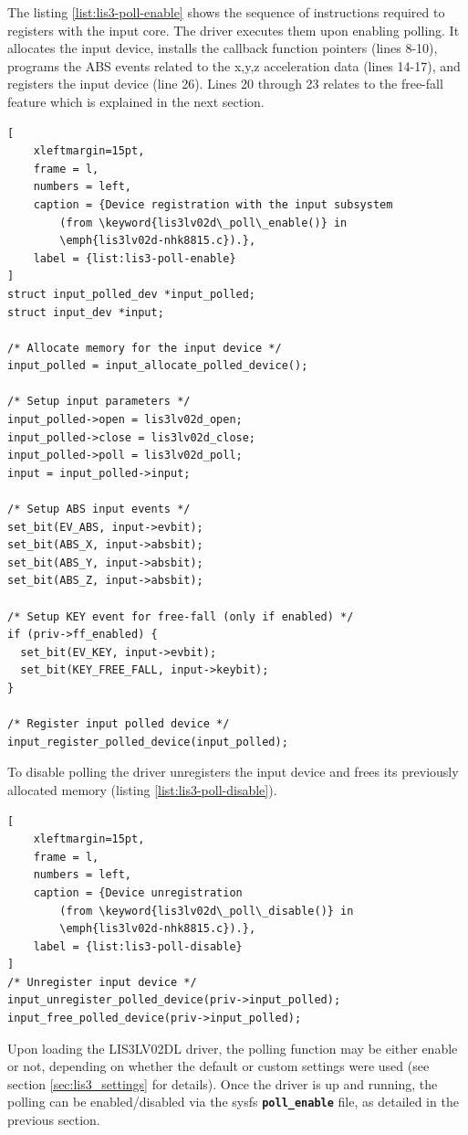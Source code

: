 \documentclass[a4paper,10pt]{article}
\newcommand{\keyword}[1]{\texttt{\textbf{#1}}}
\begin{document}
\begin{multicols}{2}
The listing \ref{list:lis3-poll-enable} shows the sequence of instructions
required to registers with the input core. The driver executes them upon
enabling polling. It allocates the input device, installs the callback
function pointers (lines 8-10), programs the ABS events related to the x,y,z
acceleration data (lines 14-17), and registers the input device (line 26).
Lines 20 through 23 relates to the free-fall feature which is explained in
the next section.

\begin{lstlisting}[
	xleftmargin=15pt,
	frame = l,
	numbers = left,
	caption = {Device registration with the input subsystem
		(from \keyword{lis3lv02d\_poll\_enable()} in
		\emph{lis3lv02d-nhk8815.c}).},
	label = {list:lis3-poll-enable}
]
struct input_polled_dev *input_polled;
struct input_dev *input;

/* Allocate memory for the input device */
input_polled = input_allocate_polled_device();

/* Setup input parameters */
input_polled->open = lis3lv02d_open;
input_polled->close = lis3lv02d_close;
input_polled->poll = lis3lv02d_poll;
input = input_polled->input;

/* Setup ABS input events */
set_bit(EV_ABS, input->evbit);
set_bit(ABS_X, input->absbit);
set_bit(ABS_Y, input->absbit);
set_bit(ABS_Z, input->absbit);

/* Setup KEY event for free-fall (only if enabled) */
if (priv->ff_enabled) {
  set_bit(EV_KEY, input->evbit);
  set_bit(KEY_FREE_FALL, input->keybit);
}

/* Register input polled device */
input_register_polled_device(input_polled);
\end{lstlisting}

To disable polling the driver unregisters the input device and frees its
previously allocated memory (listing \ref{list:lis3-poll-disable}).

\begin{lstlisting}[
	xleftmargin=15pt,
	frame = l,
	numbers = left,
	caption = {Device unregistration
		(from \keyword{lis3lv02d\_poll\_disable()} in 
		\emph{lis3lv02d-nhk8815.c}).},
	label = {list:lis3-poll-disable}
]
/* Unregister input device */
input_unregister_polled_device(priv->input_polled);
input_free_polled_device(priv->input_polled);
\end{lstlisting}

Upon loading the LIS3LV02DL driver, the polling function may be either enable
or not, depending on whether the default or custom settings were used
(see section \ref{sec:lis3_settings} for details).
Once the driver is up and running, the polling can be enabled/disabled via the
sysfs \keyword{poll\_enable} file, as detailed in the previous section.



\end{multicols}
\end{document}
